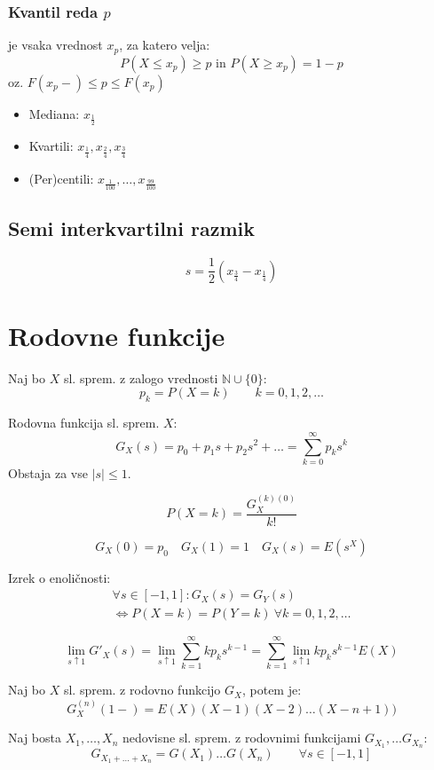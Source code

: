 \begin{multicols}{5}
\subsubsection{Kvantil reda $p$}
je vsaka vrednost $x_p$, za katero velja:
\[ P(X \leq x_p) \geq p \text{ in } P(X \geq x_p) = 1 - p \]
oz. $F(x_p-) \leq p \leq F(x_p)$

\begin{itemize}
    \item Mediana: $x_{\frac{1}{2}}$
    \item Kvartili: $x_{\frac{1}{4}}, x_{\frac{2}{4}}, x_{\frac{3}{4}}$
    \item (Per)centili: $x_{\frac{1}{100}}, \dots, x_{\frac{99}{100}}$
\end{itemize}

\subsection{Semi interkvartilni razmik}
\[ s = \frac{1}{2}\left(x_{\frac{3}{4}} - x_{\frac{1}{4}} \right)\]

\section{Rodovne funkcije}
Naj bo $X$ sl. sprem. z zalogo vrednosti $\mathbb{N} \cup \{0\}$: 
\[ p_k = P(X=k) \qquad k = 0,1,2,\dots \]

Rodovna funkcija sl. sprem. $X$:
\[G_X(s) = p_0 + p_1 s + p_2 s^2 + \dots = \sum_{k=0}^\infty p_k s^k \]
Obstaja za vse $|s| \leq 1$.

\[ P(X=k) = \frac{G_X^{(k)(0)}}{k!} \]

\[ G_X(0) = p_0 \quad G_X(1) = 1 \quad G_X(s) = E(s^X) \]

Izrek o enoličnosti:
\begin{multline*}
\forall s \in [-1, 1]: G_X(s) = G_Y(s) \\
\iff P(X=k) = P(Y=k)\ \forall k = 0, 1, 2, \dots
\end{multline*}

\[ \lim_{s \uparrow 1} G'_X(s) = \lim_{s \uparrow 1} \sum_{k=1}^\infty k p_k s^{k-1} =  \sum_{k=1}^\infty  \lim_{s \uparrow 1} k p_k s^{k-1}  E(X)\]

Naj bo $X$ sl. sprem. z rodovno funkcijo $G_X$, potem je:
\[ G_X^{(n)}(1-) = E(X)(X-1)(X-2)\dots (X-n+1))\]

Naj bosta $X_1, \dots , X_n$ nedovisne sl. sprem. z rodovnimi funkcijami $G_{X_1}, \dots G_{X_n}$:
\[ G_{X_1+\dots + X_n} = G(X_1) \dots G(X_n) \qquad \forall s \in [-1, 1]\]



\end{multicols}
